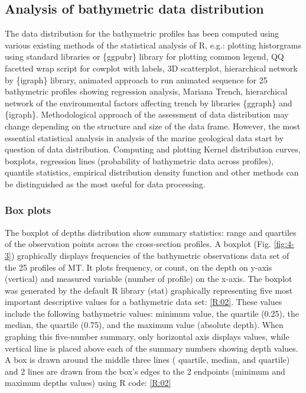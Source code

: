 \documentclass[11pt,a4paper]{report}
\begin{document}
{\subsection{Analysis of bathymetric data distribution}\label{ssec:RDDistr}
The data distribution for the bathymetric profiles has been computed using various existing methods of the statistical analysis \cite{SwanSandilands1995} of R, e.g.: plotting historgrams using standard libraries or \{ggpubr\} library for plotting common legend, QQ facetted wrap script for cowplot with labels, 3D scatterplot, hierarchical network by \{igraph\} library, animated approach to run animated sequence for 25 bathymetric profiles showing regression analysis, Mariana Trench, hierarchical network of the environmental factors affecting trench by libraries \{ggraph\} and \{igraph\}. Methodological approach of the assessment of data distribution may change depending on the structure and size of the data frame. However, the most essential statistical analysis in analysis of the marine geological data start by question of data distribution. Computing and plotting Kernel distribution curves, boxplots, regression lines (probability of bathymetric data across profiles), quantile statistics, empirical distribution density function and other methods can be distinguished as the most useful for data processing.

\subsubsection{Box plots}\label{sssec:Rboxplot}
The boxplot of depths distribution show summary statistics: range and quartiles of the observation points across the cross-section profiles. A boxplot (Fig. \ref{fig:4-3}) graphically displays frequencies of the bathymetric observations data set of the 25 profiles of \ac{MT}. It plots frequency, or count, on the depth on y-axis (vertical) and measured variable (number of profile) on the x-axis. The boxplot was generated by the default R library (stat) graphically representing five most important descriptive values for a bathymetric data set: \ref{R:02}. These values include the following bathymetric values: minimum value, the  quartile (0.25), the median, the  quartile (0.75), and the maximum value (absolute depth). When graphing this five-number summary, only horizontal axis displays values, while vertical line is placed above each of the summary numbers showing depth values. A box is drawn around the middle three lines ( quartile, median, and  quartile) and 2 lines are drawn from the box’s edges to the 2 endpoints (minimum and maximum depths values) using R code: \ref{R:02}

}
\end{document}
